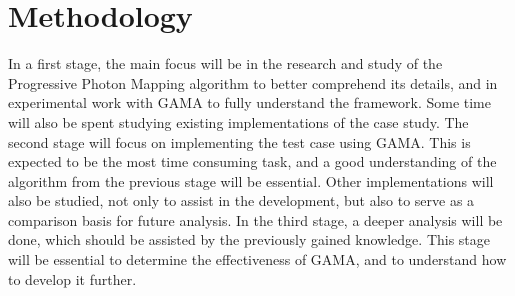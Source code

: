 \section{Methodology}

In a first stage, the main focus will be in the research and study of the Progressive Photon Mapping algorithm to better comprehend its details, and in experimental work with GAMA to fully understand the framework. Some time will also be spent studying existing implementations of the case study.
The second stage will focus on implementing the test case using GAMA. This is expected to be the most time consuming task, and a good understanding of the algorithm from the previous stage will be essential.  Other implementations will also be studied, not only to assist in the development, but also to serve as a comparison basis for future analysis.
  In the third stage, a deeper analysis will be done, which should be assisted by the previously gained knowledge. This stage will be essential to determine the effectiveness of GAMA, and to understand how to develop it further.
